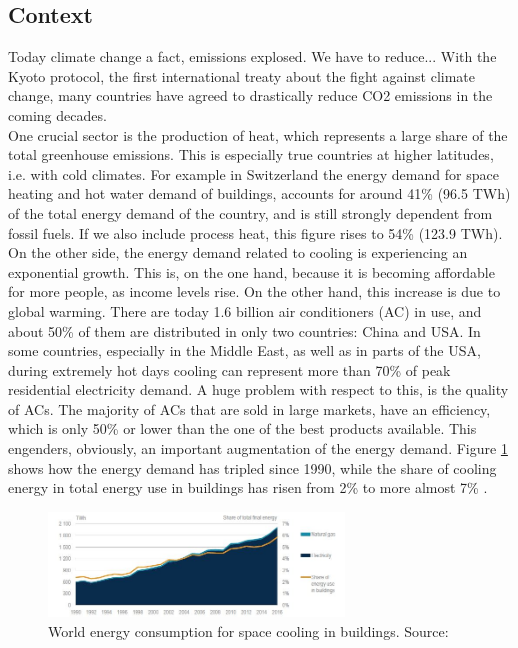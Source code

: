 \documentclass{article}
\begin{document}
\subsection{Context}
Today climate change a fact, emissions explosed. We have to reduce...
With the Kyoto protocol, the first international treaty about the fight against climate change, many countries have agreed to drastically reduce CO2 emissions in the coming decades.\\
One crucial sector is the production of heat, which represents a large share of the total greenhouse emissions. This is especially true countries at higher latitudes, i.e. with cold climates. For example in Switzerland the energy demand for space heating and hot water demand of buildings, accounts for around 41\% (96.5 TWh) of the total energy demand of the country, and is still strongly dependent from fossil fuels. If we also include process heat, this figure rises to 54\% (123.9 TWh)\cite{bacherEnergieRespektSchlusselFur2014}. \\
On the other side, the energy demand related to cooling is experiencing an exponential growth. This is, on the one hand, because it is becoming affordable for more people, as income levels rise. On the other hand, this increase is due to global warming. 
There are today 1.6 billion air conditioners (AC) in use, and about 50\% of them are distributed in only two countries: China and USA. In some countries, especially in the Middle East, as well as in parts of the USA, during extremely hot days cooling can represent more than 70\% of peak residential electricity demand. A huge problem with respect to this, is the quality of ACs. The majority of ACs that are sold in large markets, have an efficiency, which is only 50\% or lower than the one of the best products available. This engenders, obviously, an important augmentation of the energy demand. Figure \ref{fig:cooling_energy} shows how the energy demand has tripled since 1990, while the share of cooling energy in total energy use in buildings has risen from 2\% to more almost 7\% \cite{birolFutureCooling2018}. \\ 

\begin{figure}[h!]
\centering
\includegraphics[width=0.7\textwidth]{cooling_energy.JPG}
\caption{World energy consumption for space cooling in buildings. Source:\cite{birolFutureCooling2018}}
\label{fig:cooling_energy}
\end{figure}
\end{document}
